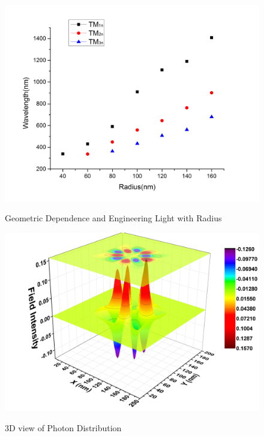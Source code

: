 \begin{figure}
  \caption{Geometric Dependence and Engineering Light with Radius}
  \centering
  \includegraphics[width=\textwidth]{pictures/LM/TMRadiusScat}
  \label{TMRadiusScat}
\end{figure}

\begin{figure}
  \caption{3D view of Photon Distribution}
  \centering
  \includegraphics[width=\textwidth]{pictures/LM/photondensity2}
  \label{photondensity2}
\end{figure}



